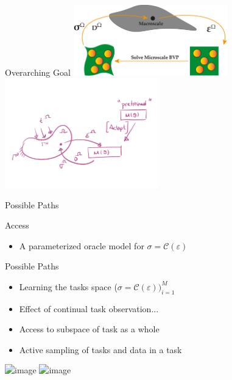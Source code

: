 \begin{frame}{Overarching Goal}
\centering
\includegraphics[width=0.5\textwidth]{Figures/intro/FE2}\includegraphics[width=0.5\textwidth]{Figures/myview/fe2}
\end{frame}

\begin{frame}{Possible Paths}
  \begin{minipage}{0.6\textwidth}
    \begin{block}{\color{white}Access}
  \begin{itemize}
    \item<1> A parameterized oracle model for $\sigma=\mathcal{C}(\varepsilon)$
  \end{itemize}
  \end{block}
  \begin{block}{\color{white}Possible Paths}
  \begin{itemize}
    \item<2> Learning the tasks space ($\sigma=\mathcal{C}(\varepsilon))_{i=1}^M$
    \item<3> Effect of continual task observation...
    \item<4> Access to subspace of task as a whole 
    \item<5> Active sampling of tasks and data in a task
  \end{itemize}
  \end{block}
  \end{minipage}%
  \begin{minipage}{0.4\textwidth}
    \includegraphics<2-4>[width=\textwidth]{Figures/myview/tasks}
    \includegraphics<5>[width=\textwidth]{Figures/myview/task_space}
  \end{minipage}
\end{frame}


